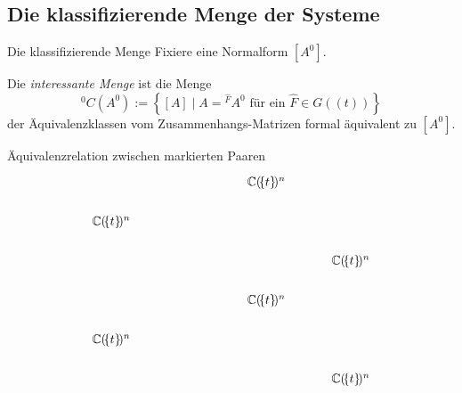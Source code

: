 \subsection{Die klassifizierende Menge der Systeme}
\begin{frame}{Die klassifizierende Menge}
  Fixiere eine Normalform $[A^0]$.

  Die \textit{interessante Menge} ist die Menge
  \[
    {}^0\!C(A^0):=\left\{\left[A\right]
      \mid A={}^{\hat F}\!A^0 \text{ für ein } \hat F\in G(\!(t)\!)\right\}
  \]
  der Äquivalenzklassen vom Zusammenhangs-Matrizen formal äquivalent zu $[A^0]$.

\end{frame}
\begin{frame}[fragile]{Äquivalenzrelation zwischen markierten Paaren}
  \[ \begin{tikzcd}[column sep=1cm,row sep=.5cm]
      &&&\C(\!\{t\}\!)^n
      \\\C(\!\{t\}\!)^n
      \\&&&&\C(\!\{t\}\!)^n
      \\&&&\C(\!\{t\}\!)^n
      \\\C(\!\{t\}\!)^n
      \\&&&&\C(\!\{t\}\!)^n
    \end{tikzcd} \]
\end{frame}

